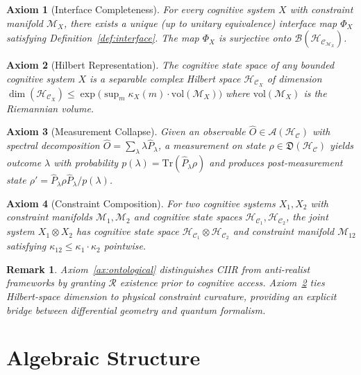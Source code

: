 \documentclass[twocolumn,aps,prd,superscriptaddress,nofootinbib]{revtex4-2}
\newtheorem{axiom}{Axiom}[section]
\newtheorem{remark}{Remark}[section]
\newcommand{\HC}{\mathcal{H}_{\mathcal{C}}}
\newcommand{\CR}{\mathcal{R}}
\newcommand{\CM}{\mathcal{M}}
\newcommand{\CA}{\mathcal{A}}
\newcommand{\CB}{\mathcal{B}}
\newcommand{\hatO}{\hat{O}}
\newcommand{\hatP}{\hat{P}}
\newcommand{\Tr}{\mathrm{Tr}}
\begin{document}
\begin{axiom}[Interface Completeness]
\label{ax:interface}
For every cognitive system $X$ with constraint manifold $\CM_X$, there exists
a unique (up to unitary equivalence) interface map $\Phi_X$ satisfying
Definition~\ref{def:interface}.  The map $\Phi_X$ is surjective onto
$\CB(\HC_{\CM_X})$.
\end{axiom}

\begin{axiom}[Hilbert Representation]
\label{ax:hilbert}
The cognitive state space of any bounded cognitive system $X$ is a separable
complex Hilbert space $\HC_X$ of dimension $\dim(\HC_X) \leq
\exp\bigl(\sup_m \kappa_X(m) \cdot \mathrm{vol}(\CM_X)\bigr)$ where
$\mathrm{vol}(\CM_X)$ is the Riemannian volume.
\end{axiom}

\begin{axiom}[Measurement Collapse]
\label{ax:measurement}
Given an observable $\hatO \in \CA(\HC)$ with spectral decomposition
$\hatO = \sum_\lambda \lambda \hatP_\lambda$, a measurement on state
$\rho \in \mathfrak{D}(\HC)$ yields outcome $\lambda$ with probability
$p(\lambda) = \Tr(\hatP_\lambda \rho)$ and produces post-measurement state
$\rho' = \hatP_\lambda \rho \hatP_\lambda / p(\lambda)$.
\end{axiom}

\begin{axiom}[Constraint Composition]
\label{ax:composition}
For two cognitive systems $X_1, X_2$ with constraint manifolds $\CM_1, \CM_2$
and cognitive state spaces $\HC_1, \HC_2$, the joint system $X_1 \otimes X_2$
has cognitive state space $\HC_1 \otimes \HC_2$ and constraint manifold
$\CM_{12}$ satisfying $\kappa_{12} \leq \kappa_1 \cdot \kappa_2$ pointwise.
\end{axiom}

\begin{remark}
Axiom~\ref{ax:ontological} distinguishes CIIR from anti-realist frameworks by
granting $\CR$ existence prior to cognitive access.  Axiom~\ref{ax:hilbert}
ties Hilbert-space dimension to physical constraint curvature, providing an
explicit bridge between differential geometry and quantum formalism.
\end{remark}

\section{Algebraic Structure}
\label{sec:algebra}
\end{document}
